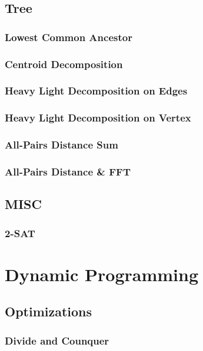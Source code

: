 \documentclass[10pt,a4paper]{report}
\begin{document}
	\newpage
	\section{Tree}
		\subsection{Lowest Common Ancestor}
			
		\newpage
		\subsection{Centroid Decomposition}
			
		\newpage
		\subsection{Heavy Light Decomposition on Edges}
			
		\subsection{Heavy Light Decomposition on Vertex}
		\subsection{All-Pairs Distance Sum}
		\subsection{All-Pairs Distance \& FFT}
		
	\section{MISC}
		\subsection{2-SAT}
		
\chapter{Dynamic Programming}

	\section{Optimizations}
		\subsection{Divide and Counquer}
			
		\newpage
\end{document}
